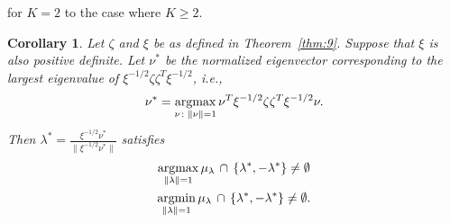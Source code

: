 \documentclass[final]{IEEEtran}
\newtheorem{corollary}[theorem]{Corollary}
\theoremstyle{definition}
\newcommand{\argmax}{\operatornamewithlimits{argmax}}
\newcommand{\argmin}{\operatornamewithlimits{argmin}}
\begin{document}
\cite{lee:_laten_proces_model_time_attrib_random_graph} for $K = 2$ to the case
where $K \geq 2$. 
\begin{corollary}
  \label{cor:1}
  Let $\zeta$ and $\xi$ be as defined in Theorem~\ref{thm:9}. Suppose
  that $\xi$ is also positive definite. Let $\nu^{*}$ be the
  normalized eigenvector corresponding to the largest eigenvalue of $ \xi^{-1/2}
  \zeta \zeta^{T} \xi^{-1/2}$, i.e.,
 \begin{equation}
   \label{eq:9}
  \nu^{*} = \argmax_{\nu \colon \| \nu \| = 1}
  \nu^{T} \xi^{-1/2} \zeta \zeta^{T} \xi^{-1/2}
  \nu.
 \end{equation}
 Then $\lambda^{*} = \tfrac{\xi^{-1/2} \nu^{*}}{\|\xi^{-1/2} \nu^{*} \|}$ satisfies
 \begin{gather}
   \label{eq:8}
 \argmax_{ \|\lambda\| = 1}
 \mu_{\lambda} \, \cap \, \{\lambda^{*}, - \lambda^{*}\} \not = \emptyset \\
 \argmin_{ \| \lambda \| = 1} \mu_{\lambda} \, \cap \, \{\lambda^{*}, -
 \lambda^{*}\} \not = \emptyset.
 \end{gather}
\end{corollary}
\end{document}
